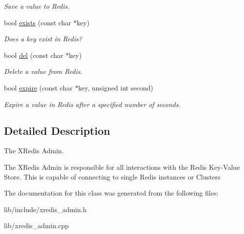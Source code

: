 \begin{DoxyCompactItemize}
\begin{DoxyCompactList}\small\item\em Save a value to Redis. \end{DoxyCompactList}\item 
\hypertarget{classxRedisAdmin_afe27654a8ff1783b03f5dc403d2c82e6}{bool \hyperlink{classxRedisAdmin_afe27654a8ff1783b03f5dc403d2c82e6}{exists} (const char $\ast$key)}\label{classxRedisAdmin_afe27654a8ff1783b03f5dc403d2c82e6}

\begin{DoxyCompactList}\small\item\em Does a key exist in Redis? \end{DoxyCompactList}\item 
\hypertarget{classxRedisAdmin_aec6bb15ec6d7764423e6abddac9a7c3c}{bool \hyperlink{classxRedisAdmin_aec6bb15ec6d7764423e6abddac9a7c3c}{del} (const char $\ast$key)}\label{classxRedisAdmin_aec6bb15ec6d7764423e6abddac9a7c3c}

\begin{DoxyCompactList}\small\item\em Delete a value from Redis. \end{DoxyCompactList}\item 
\hypertarget{classxRedisAdmin_a97cac4467038a8b4309029ed13563ff2}{bool \hyperlink{classxRedisAdmin_a97cac4467038a8b4309029ed13563ff2}{expire} (const char $\ast$key, unsigned int second)}\label{classxRedisAdmin_a97cac4467038a8b4309029ed13563ff2}

\begin{DoxyCompactList}\small\item\em Expire a value in Redis after a specified number of seconds. \end{DoxyCompactList}\end{DoxyCompactItemize}


\subsection{Detailed Description}
The X\-Redis Admin. 

The X\-Redis Admin is responsible for all interactions with the Redis Key-\/\-Value Store. This is capable of connecting to single Redis instances or Clusters 

The documentation for this class was generated from the following files\-:\begin{DoxyCompactItemize}
\item 
lib/include/xredis\-\_\-admin.\-h\item 
lib/xredis\-\_\-admin.\-cpp\end{DoxyCompactItemize}
